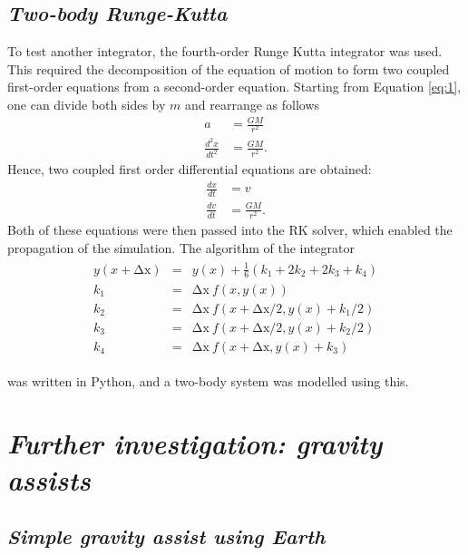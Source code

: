\documentclass[11pt, english]{report}
\begin{document}
\subsection{\textsl{Two-body Runge-Kutta}}
\normalsize{\noindent To test another integrator, the fourth-order Runge Kutta integrator was used. This required the decomposition of the equation of motion to form two coupled first-order equations from a second-order equation. Starting from Equation \ref{eq:1}, one can divide both sides by $m$ and rearrange as follows
\begin{align}
    a &= \frac{GM}{r^2} \\
    \frac{d^2x}{dt^2} &= \frac{GM}{r^2}.
\end{align}
Hence, two coupled first order differential equations are obtained:
\begin{align}
    \frac{dx}{dt} &= v \\
    \frac{dv}{dt} &= \frac{GM}{r^2}.
\end{align}
Both of these equations were then passed into the RK solver, which enabled the propagation of the simulation. The algorithm of the integrator \cite{bowler_phas0030_nodate}
\begin{align}
\begin{matrix} 
y(x+\mathrm{\Delta x})&=&y(x)+\frac{1}{6}\left(k_1+2k_2+2k_3+k_4\right)\\k_1&=&\mathrm{\Delta x}\ f(x,y(x))\\k_2&=&\mathrm{\Delta x}\ f(x+\mathrm{\Delta x}/2,y(x)+k_1/2)\\k_3&=&\mathrm{\Delta x}\ f(x+\mathrm{\Delta x}/2,y(x)+k_2/2)\\k_4&=&\mathrm{\Delta x}\ f(x+\mathrm{\Delta x},y(x)+k_3) \end{matrix}
\end{align}

\noindent was written in Python, and a two-body system was modelled using this.}

\section{\textsl{Further investigation: gravity assists}}
\subsection{\textsl{Simple gravity assist using Earth}}
\end{document}
